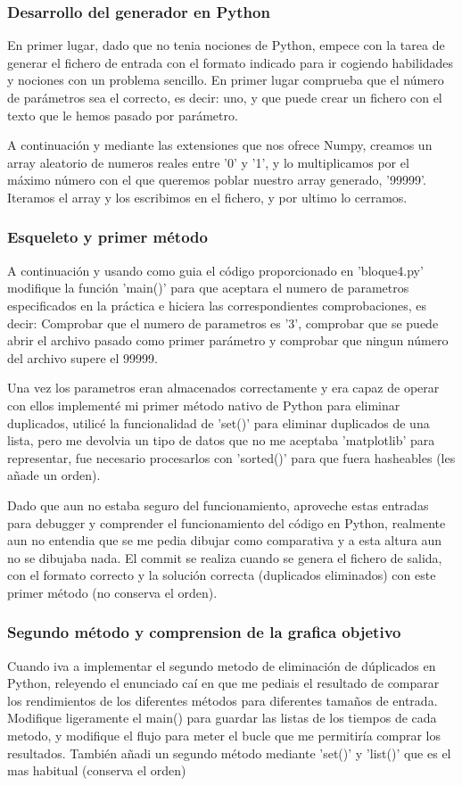 \documentclass[10pt,journal,compsoc]{IEEEtran}
\begin{document}
\subsubsection{Desarrollo del generador en Python}
En primer lugar, dado que no tenia nociones de Python, empece con la tarea de generar el fichero de entrada con el formato indicado para ir cogiendo habilidades y nociones con un problema sencillo. 
En primer lugar comprueba que el número de parámetros sea el correcto, es decir: uno, y que puede crear un fichero con el texto que le hemos pasado por parámetro.

A continuación y mediante las extensiones que nos ofrece Numpy, creamos un array aleatorio de numeros reales entre '0' y '1', y lo multiplicamos por el máximo número con el que queremos poblar nuestro array generado, '99999'.
Iteramos el array y los escribimos en el fichero, y por ultimo lo cerramos.

\subsubsection{Esqueleto y primer método}
A continuación y usando como guia el código proporcionado en 'bloque4.py' modifique la función 'main()' para que aceptara el numero de parametros especificados en la práctica e hiciera las correspondientes comprobaciones, es decir: Comprobar que el numero de parametros es '3', comprobar que se puede abrir el archivo pasado como primer parámetro y comprobar que ningun número del archivo supere el 99999.

Una vez los parametros eran almacenados correctamente y era capaz de operar con ellos implementé mi primer método nativo de Python para eliminar duplicados, utilicé la funcionalidad de 'set()' para eliminar duplicados de una lista, pero me devolvia un tipo de datos que no me aceptaba 'matplotlib' para representar, fue necesario procesarlos con 'sorted()' para que fuera hasheables (les añade un orden).

Dado que aun no estaba seguro del funcionamiento, aproveche estas entradas para debugger y comprender el funcionamiento del código en Python, realmente aun no entendia que se me pedia dibujar como comparativa y a esta altura aun no se dibujaba nada. El commit se realiza cuando se genera el fichero de salida, con el formato correcto y la solución correcta (duplicados eliminados) con este primer método (no conserva el orden).

\subsubsection{Segundo método y comprension de la grafica objetivo}
Cuando iva a implementar el segundo metodo de eliminación de dúplicados en Python, releyendo el enunciado caí en que me pediais el resultado de comparar los rendimientos de los diferentes métodos para diferentes tamaños de entrada. Modifique ligeramente el main() para guardar las listas de los tiempos de cada metodo, y modifique el flujo para meter el bucle que me permitiría comprar los resultados. También añadi un segundo método mediante 'set()' y 'list()' que es el mas habitual (conserva el orden)
\end{document}
